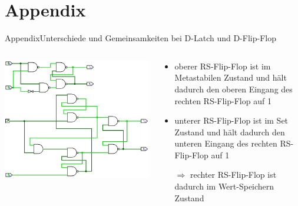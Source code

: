
\section{Appendix}

\setcounter{exercise}{1}

\begin{frame}{Appendix}{Unterschiede und Gemeinsamkeiten bei D-Latch und D-Flip-Flop}
  \begin{columns}
    \begin{column}{0.4\textwidth}
      \includegraphics[width=0.6\paperheight, center]{./figures/011.png}
    \end{column}
    \begin{column}{0.6\textwidth}
      \begin{itemize}
        \item \alert{oberer RS-Flip-Flop} ist im \alert{Metastabilen Zustand} und hält dadurch den oberen Eingang des \alert{rechten RS-Flip-Flop} auf \alert{1}
        \item \alert{unterer RS-Flip-Flop} ist im \alert{Set Zustand} und hält dadurch den unteren Eingang des \alert{rechten RS-Flip-Flop} auf \alert{1}
        \item[\textcolor{PrimaryColor}{$\Rightarrow$}] \alert{rechter RS-Flip-Flop} ist dadurch im \alert{Wert-Speichern Zustand}
      \end{itemize}
    \end{column}
  \end{columns}
\end{frame}
